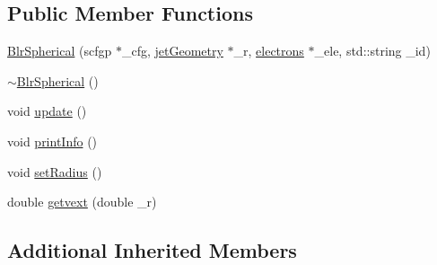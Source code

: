 \subsection*{Public Member Functions}
\begin{DoxyCompactItemize}
\item 
\hyperlink{classBlrSpherical_aaa33e7d7429aaf2ece12eca0599b4273}{Blr\-Spherical} (scfgp $\ast$\-\_\-cfg, \hyperlink{classjetGeometry}{jet\-Geometry} $\ast$\-\_\-r, \hyperlink{classelectrons}{electrons} $\ast$\-\_\-ele, std\-::string \-\_\-id)
\item 
\hyperlink{classBlrSpherical_a65f7ff9e2207d6558d0ed4ada8a6f049}{$\sim$\-Blr\-Spherical} ()
\item 
void \hyperlink{classBlrSpherical_ad67ab24f0b7f0ec3a0893fd2e3170f6c}{update} ()
\item 
void \hyperlink{classBlrSpherical_a101b95271855f15f1049fcea9efde235}{print\-Info} ()
\item 
void \hyperlink{classBlrSpherical_adc2876b14e36b86f5a35d31c708d5d35}{set\-Radius} ()
\item 
double \hyperlink{classBlrSpherical_aaf00f59d04b5e193aa47959dd1cc1065}{getvext} (double \-\_\-r)
\end{DoxyCompactItemize}
\subsection*{Additional Inherited Members}


